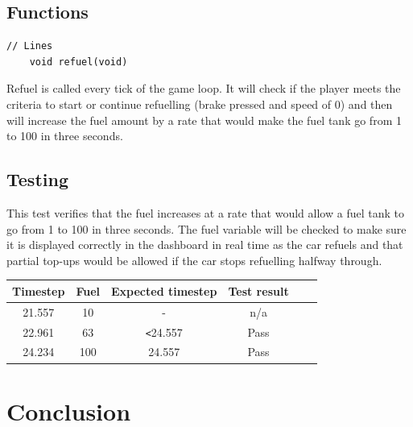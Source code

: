 \documentclass{article}
\begin{document}
\subsection*{Functions}
\begin{lstlisting}[style=CStyle]
	// Lines
	void refuel(void)
\end{lstlisting}
Refuel is called every tick of the game loop. It will check if the player meets the criteria to start or continue refuelling (brake pressed and speed of 0) and then will increase the fuel amount by a rate that would make the fuel tank go from 1 to 100 in three seconds.

\subsection*{Testing}
This test verifies that the fuel increases at a rate that would allow a fuel tank to go from 1 to 100 in three seconds. The fuel variable will be checked to make sure it is displayed correctly in the dashboard in real time as the car refuels and that partial top-ups would be allowed if the car stops refuelling halfway through. 
\begin{center}
\begin{tabular}{ c c c c c c }
Timestep	& Fuel		& Expected timestep	& Test result	\\ \hline
21.557	& 10		& - 				& n/a 		\\
22.961	& 63		& \verb|<|24.557 		& Pass	\\
24.234	& 100		& 24.557 			& Pass 	\\ \hline

\end{tabular}
\end{center}


\clearpage

\section{Conclusion}
\end{document}
